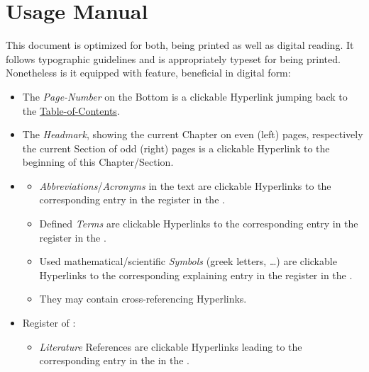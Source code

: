 %
\section{Usage Manual}

This document is optimized for both, being printed as well as digital reading.
It follows typographic guidelines and is appropriately typeset for being printed.
Nonetheless is it equipped with feature, beneficial in digital form:

\begin{itemize}
\item
    The \textit{Page-Number} on the Bottom is a clickable Hyperlink jumping back to the \hyperref[chap:ToC]{Table-of-Contents}.
\item
    The \textit{Headmark}, showing the current Chapter on even (left) pages, respectively the current Section of odd (right) pages is a clickable Hyperlink to the beginning of this Chapter/Section.
\item
    \hyperref[chap:Glossary]{}
    \begin{itemize}
    \item
        \textit{Abbreviations}/\textit{Acronyms} in the text are clickable Hyperlinks to the corresponding entry in the \hyperref[sec:Acronyms]{} register in the .
    \item
        Defined \textit{Terms} are clickable Hyperlinks to the corresponding entry in the \hyperref[sec:Glossaries]{} register in the .
    \item
        Used mathematical/scientific \textit{Symbols} (greek letters, \ldots) are clickable Hyperlinks to the corresponding explaining entry in the \hyperref[sec:Symbols]{} register in the .
    \item
        They may contain cross-referencing Hyperlinks.
    \end{itemize}
\item
    Register of \hyperref[chap:literature]{}:
    \hyperref[chap:literature]{}
    \begin{itemize}
    \item
        \textit{Literature} References are clickable Hyperlinks leading to the corresponding entry in the \hyperref[chap:literature]{} in the .

\end{itemize}
\end{itemize}
